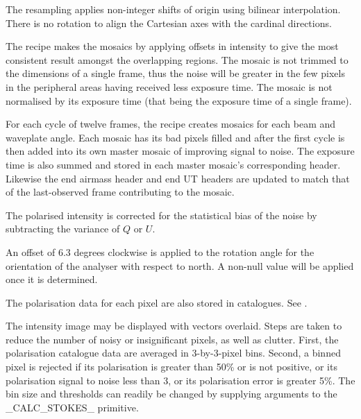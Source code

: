 \documentclass[twoside,11pt,nolof]{starlink}
\begin{document}
{{{         \sstitem
         The resampling applies non-integer shifts of origin using
         bilinear interpolation.  There is no rotation to align the
         Cartesian axes with the cardinal directions.

         \sstitem
         The recipe makes the mosaics by applying offsets in intensity
         to give the most consistent result amongst the overlapping regions.
         The mosaic is not trimmed to the dimensions of a single frame, thus
         the noise will be greater in the few pixels in the peripheral areas
         having received less exposure time.  The mosaic is not normalised by
         its exposure time (that being the exposure time of a single frame).

         \sstitem
         For each cycle of twelve frames, the recipe creates mosaics
         for each beam and waveplate angle.  Each mosaic has its bad pixels
         filled and after the first cycle is then added into its own master
         mosaic of improving signal to noise.  The exposure time is also
         summed and stored in each master mosaic's corresponding
	 header. Likewise the end airmass header and end UT headers
	 are updated to match that of the last-observed frame
	 contributing to the mosaic.

         \sstitem
         The polarised intensity is corrected for the statistical bias
         of the noise by subtracting the variance of $Q$ or $U$.

         \sstitem
         An offset of 6.3 degrees clockwise is applied to the rotation
         angle for the orientation of the analyser with respect to north.
         A non-null value will be applied once it is determined.

         \sstitem
         The polarisation data for each pixel are also stored in
         catalogues.  See .

         \sstitem
         The intensity image may be displayed with vectors overlaid.
         Steps are taken to reduce the number of noisy or insignificant
         pixels, as well as clutter.  First, the polarisation catalogue data
         are averaged in 3-by-3-pixel bins.  Second, a binned pixel is
         rejected if its polarisation is greater than 50\% or is not positive,
         or its polarisation signal to noise less than 3, or its polarisation
         error is greater 5\%.  The bin size and thresholds can readily be
         changed by supplying arguments to the \_CALC\_STOKES\_ primitive.

}}}
\end{document}
